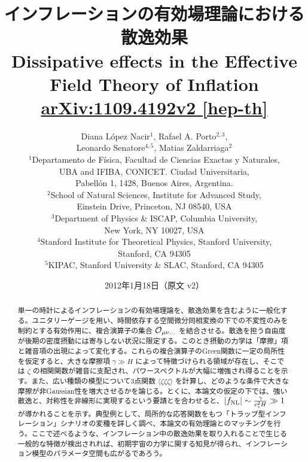 \documentclass[a4paper,11pt]{ltjsarticle}
\title{\bfseries インフレーションの有効場理論における散逸効果\\[0.5em]
\large Dissipative effects in the Effective Field Theory of Inflation\\[0.4em]
\normalsize \href{https://arxiv.org/pdf/1109.4192v2}{arXiv:1109.4192v2 [hep-th]}}
\author{\parbox{0.96\textwidth}{\centering
Diana L\'opez Nacir$^{1}$, Rafael A. Porto$^{2,3}$,\\
Leonardo Senatore$^{4,5}$, Matias Zaldarriaga$^{2}$\\[0.8em]
\small
$^1$Departamento de F\'isica, Facultad de Ciencias Exactas y Naturales,\\
UBA and IFIBA, CONICET. Ciudad Universitaria,\\
Pabell\'on 1, 1428, Buenos Aires, Argentina.\\[0.3em]
$^2$School of Natural Sciences, Institute for Advanced Study,\\
Einstein Drive, Princeton, NJ 08540, USA\\[0.3em]
$^3$Department of Physics \& ISCAP, Columbia University,\\
New York, NY 10027, USA\\[0.3em]
$^4$Stanford Institute for Theoretical Physics, Stanford University,\\
Stanford, CA 94305\\[0.3em]
$^5$KIPAC, Stanford University \& SLAC, Stanford, CA 94305
}}
\date{2012年1月18日（原文 v2）}
\numberwithin{equation}{section}
\newcommand{\calo}{{\cal O}}
\begin{document}
\maketitle
\begin{abstract}
単一の時計によるインフレーションの有効場理論を、散逸効果を含むように一般化する。ユニタリーゲージを用い、時間依存する空間微分同相変換の下での不変性のみを制約とする有効作用に、複合演算子の集合 $\calo_{\mu\nu\ldots}$ を結合させる。散逸を担う自由度が後期の密度摂動には寄与しない状況に限定する。このとき摂動の力学は「摩擦」項と雑音項の出現によって変化する。これらの複合演算子のGreen関数に一定の局所性を仮定すると、大きな摩擦項 $\gamma\gg H$ によって特徴づけられる領域が存在し、そこでは $\zeta$ の相関関数が雑音に支配され、パワースペクトルが大幅に増強され得ることを示す。また、広い種類の模型について3点関数 $\langle\zeta\zeta\zeta\rangle$ を計算し、どのような条件で大きな摩擦が非Gaussian性を増大させるかを論じる。とくに、本論文の仮定の下では、強い散逸と、対称性を非線形に実現するという要請とを合わせると、$|f_{\rm NL}|\sim\frac{\gamma}{c_s^2H}\gg1$ が導かれることを示す。典型例として、局所的な応答関数をもつ「トラップ型インフレーション」シナリオの変種を詳しく調べ、本論文の有効理論とのマッチングを行う。ここで述べるような、インフレーション中の散逸効果を取り入れることで生じる一般的な特徴が検出されれば、初期宇宙の力学に関する知見が得られ、インフレーション模型のパラメータ空間も広がるであろう。
\end{abstract}
\clearpage
\hypertarget{toc}{}
\tableofcontents
\clearpage



\clearpage

\clearpage
\renewcommand{\refname}{\hyperlink{toc}{参考文献}}


\end{document}
